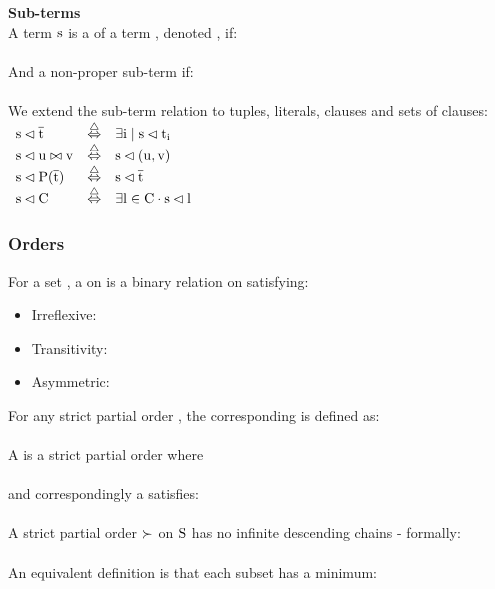 \bigskip


\noindent
\textbf{Sub-terms}\\
A term $\mathrm{s}$ is a  of a term , denoted , if:\\
\\
And a non-proper sub-term if:\\
\\
We extend the sub-term relation to tuples, literals, clauses and sets of clauses:\\
$
\begin{array}{lll}
\m{s \lhd \tup{t}}    & \equivdef & \m{\exists i \mid s \lhd t_i}\\
\m{s \lhd u \bowtie v} & \equivdef & \m{s \lhd (u,v)}\\
\m{s \lhd \fa{P}{t}}   & \equivdef & \m{s \lhd \tup{t}}\\
\m{s \lhd C}           & \equivdef & \m{\exists l \in C \cdot s \lhd l}\\
\end{array}
$




\subsubsection*{Orders}\label{section:preliminaties:ordering}
For a set , a   on  is a binary relation on  satisfying:
\begin{itemize}
	\item Irreflexive: 
	\item Transitivity: 
	\item Asymmetric: 
\end{itemize}
For any strict partial order \m{\succ}, the corresponding  \m{\succeq} is defined as:\\
\\
A  is a strict partial order where \\
 \\
and correspondingly a  satisfies:\\
\\
A  strict partial order $\mathrm{\succ}$ on $\mathrm{S}$ has no infinite descending chains - formally:\\
 \\
An equivalent definition is that each subset has a minimum:\\

